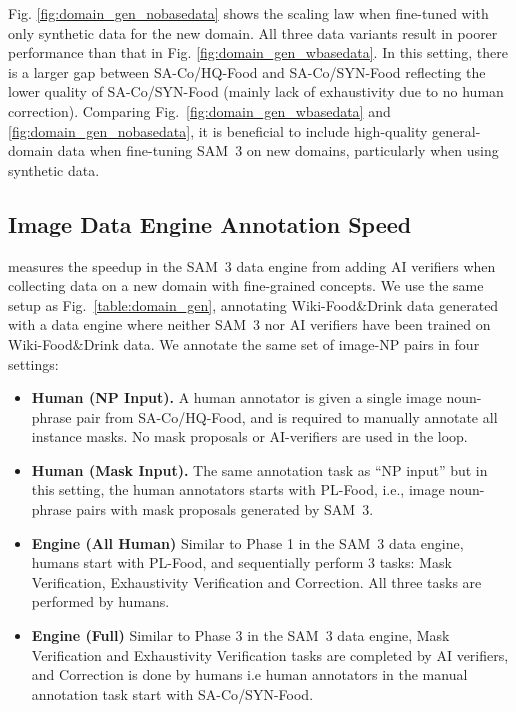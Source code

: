 \documentclass[]{fairmeta}
\newcommand{\model}{SAM~3\xspace}
\newcommand{\dsname}{{SA-Co}\xspace}
\newcommand{\trainhq}{{\dsname/HQ}\xspace}
\newcommand{\trainsyn}{{\dsname/SYN}\xspace}
\begin{document}
Fig. \ref{fig:domain_gen_nobasedata} shows the scaling law when fine-tuned with only synthetic data for the new domain. All three data variants result in poorer performance than that in Fig. \ref{fig:domain_gen_wbasedata}. In this setting, there is a larger gap between \trainhq-Food and \trainsyn-Food reflecting the lower quality of \trainsyn-Food (mainly lack of exhaustivity due to no human correction). Comparing Fig.~\ref{fig:domain_gen_wbasedata} and \ref{fig:domain_gen_nobasedata}, it is beneficial to include high-quality general-domain data when fine-tuning \model on new domains, particularly when using synthetic data. 

\subsection{Image Data Engine Annotation Speed}
\label{sec:efficient_domain_exp}
 measures the speedup in the \model data engine from adding AI verifiers when collecting data on a new domain with fine-grained concepts. We use the same setup as Fig.~\ref{table:domain_gen}, annotating Wiki-Food\&Drink data generated with a data engine where neither \model nor AI verifiers have been trained on Wiki-Food\&Drink data. We annotate the same set of image-NP pairs in four settings:
\begin{itemize}
	\item \textbf{Human (NP Input).} A human annotator is given a single image noun-phrase pair from \trainhq-Food, and is required to manually annotate all instance masks. No mask proposals or AI-verifiers are used in the loop.
	\item \textbf{Human (Mask Input).} The same annotation task as ``NP input'' but in this setting, the human annotators starts with PL-Food, i.e., image noun-phrase pairs with mask proposals generated by \model.
	\item \textbf{Engine (All Human)} Similar to Phase 1 in the \model data engine, humans start with PL-Food, and sequentially perform 3 tasks: Mask Verification, Exhaustivity Verification and Correction. All three tasks are performed by humans. 
	\item \textbf{Engine (Full)} Similar to Phase 3 in the \model data engine, Mask Verification and Exhaustivity Verification tasks are completed by AI verifiers, and Correction is done by humans i.e human annotators in the manual annotation task start with \trainsyn-Food.
\end{itemize}
\end{document}
